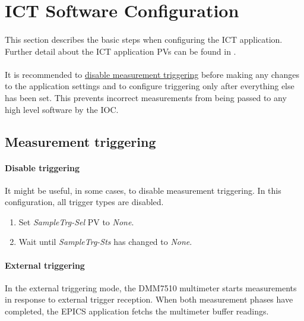 \documentclass[openany]{article}
\begin{document}
\section{ICT Software Configuration}

	\paragraph{} This section describes the basic steps when configuring the ICT application. Further detail about the ICT application PVs can be found in \emph{}.

	\paragraph{} It is recommended to \hyperref[disable-triggering]{disable measurement triggering} before making any changes to the application settings and to configure triggering only after everything else has been set. This prevents incorrect measurements from being passed to any high level software by the IOC.

	\subsection{Measurement triggering}

		\paragraph{Disable triggering}\label{disable-triggering} It might be useful, in some cases, to disable measurement triggering. In this configuration, all trigger types are disabled.

			\begin{enumerate}
				\item Set \emph{SampleTrg-Sel} PV to \emph{None}.
				\item Wait until \emph{SampleTrg-Sts} has changed to \emph{None}.
			\end{enumerate}

		\paragraph{External triggering} In the external triggering mode, the DMM7510 multimeter starts measurements in response to external trigger reception. When both measurement phases have completed, the EPICS application fetchs the multimeter buffer readings.
\end{document}

